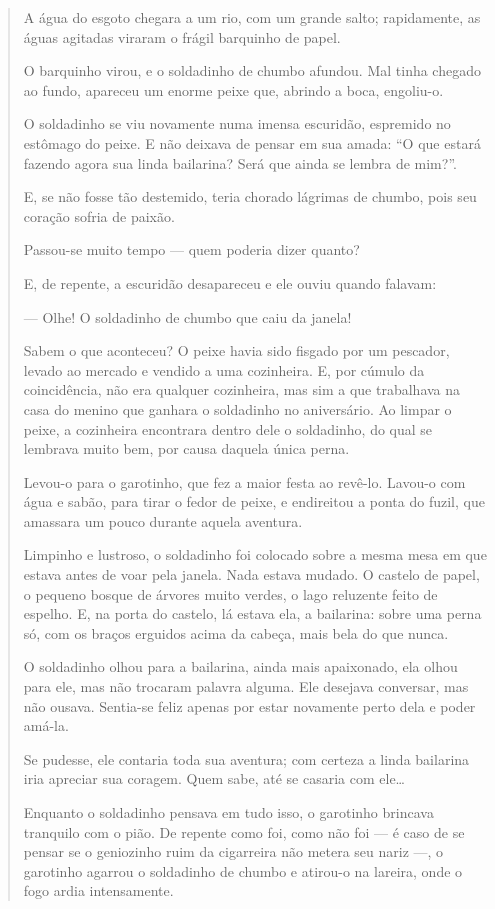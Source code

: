 \begin{quote}
A água do esgoto chegara a um rio, com um grande salto; rapidamente, as
águas agitadas viraram o frágil barquinho de papel.

O barquinho virou, e o soldadinho de chumbo afundou. Mal tinha chegado
ao fundo, apareceu um enorme peixe que, abrindo a boca, engoliu-o.

O soldadinho se viu novamente numa imensa escuridão, espremido no
estômago do peixe. E não deixava de pensar em sua amada: ``O que estará
fazendo agora sua linda bailarina? Será que ainda se lembra de mim?''.

E, se não fosse tão destemido, teria chorado lágrimas de chumbo, pois
seu coração sofria de paixão.

Passou-se muito tempo --- quem poderia dizer quanto?

E, de repente, a escuridão desapareceu e ele ouviu quando falavam:

--- Olhe! O soldadinho de chumbo que caiu da janela!

Sabem o que aconteceu? O peixe havia sido fisgado por um pescador,
levado ao mercado e vendido a uma cozinheira. E, por cúmulo da
coincidência, não era qualquer cozinheira, mas sim a que trabalhava na
casa do menino que ganhara o soldadinho no aniversário. Ao limpar o
peixe, a cozinheira encontrara dentro dele o soldadinho, do qual se
lembrava muito bem, por causa daquela única perna.

Levou-o para o garotinho, que fez a maior festa ao revê-lo. Lavou-o com
água e sabão, para tirar o fedor de peixe, e endireitou a ponta do
fuzil, que amassara um pouco durante aquela aventura.

Limpinho e lustroso, o soldadinho foi colocado sobre a mesma mesa em que
estava antes de voar pela janela. Nada estava mudado. O castelo de
papel, o pequeno bosque de árvores muito verdes, o lago reluzente feito
de espelho. E, na porta do castelo, lá estava ela, a bailarina: sobre
uma perna só, com os braços erguidos acima da cabeça, mais bela do que
nunca.

O soldadinho olhou para a bailarina, ainda mais apaixonado, ela olhou
para ele, mas não trocaram palavra alguma. Ele desejava conversar, mas
não ousava. Sentia-se feliz apenas por estar novamente perto dela e
poder amá-la.

Se pudesse, ele contaria toda sua aventura; com certeza a linda
bailarina iria apreciar sua coragem. Quem sabe, até se casaria com
ele\ldots{}

Enquanto o soldadinho pensava em tudo isso, o garotinho brincava
tranquilo com o pião. De repente como foi, como não foi --- é caso de se
pensar se o geniozinho ruim da cigarreira não metera seu nariz ---, o
garotinho agarrou o soldadinho de chumbo e atirou-o na lareira, onde o
fogo ardia intensamente.


\end{quote}
